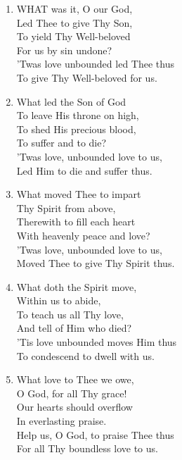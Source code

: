 \documentclass[11pt,a4paper]{article}
\begin{document}
\begin{enumerate}
    \item WHAT was it, O our God, \\
        Led Thee to give Thy Son, \\
        To yield Thy Well-beloved \\
        For us by sin undone? \\
        'Twas love unbounded led Thee thus \\
        To give Thy Well-beloved for us.

    \item What led the Son of God \\
        To leave His throne on high, \\
        To shed His precious blood, \\
        To suffer and to die? \\
        'Twas love, unbounded love to us, \\
        Led Him to die and suffer thus.

    \item What moved Thee to impart \\
        Thy Spirit from above, \\
        Therewith to fill each heart \\
        With heavenly peace and love? \\
        'Twas love, unbounded love to us, \\
        Moved Thee to give Thy Spirit thus.

    \item What doth the Spirit move, \\
        Within us to abide, \\
        To teach us all Thy love, \\
        And tell of Him who died? \\
        'Tis love unbounded moves Him thus \\
        To condescend to dwell with us.

    \item What love to Thee we owe, \\
        O God, for all Thy grace! \\
        Our hearts should overflow \\
        In everlasting praise. \\
        Help us, O God, to praise Thee thus \\
        For all Thy boundless love to us.

\end{enumerate}
\end{document}
